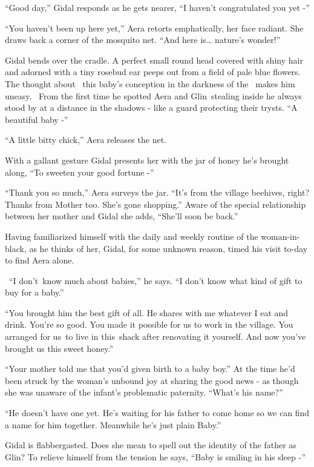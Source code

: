 \documentclass[twoside,11pt]{book}
\begin{document}
``Good day,'' Gidal responds as he gets nearer, ``I haven't congratulated you yet
-''

``You haven't been up here yet,'' Aera retorts emphatically, her face radiant. She draws back
a corner of the mosquito net. ``And here is{\dots} nature's wonder!'' ~

Gidal bends over the cradle. A perfect small round head covered with shiny hair and adorned with a tiny rosebud ear
peeps out from a field of pale blue flowers. The thought about \ this baby's conception in the darkness of the \ makes
him uneasy. ~From the first time he spotted Aera and Glin~stealing inside he always stood by at a distance in the
shadows - like a guard protecting their trysts. ``A beautiful baby -''

``A little bitty chick,'' Aera releases the net.

With a gallant gesture Gidal presents her with the jar of honey he's brought along, ``To sweeten your good
fortune -''

``Thank you so much,'' Aera surveys the jar. ``It's from the village beehives,
right? Thanks from Mother too. She's gone shopping.'' Aware of the special relationship between her mother
and Gidal she adds, ``She'll soon be back.''

Having familiarized himself with the daily and weekly routine of the woman-in-black, as he thinks of her, Gidal, for
some unknown reason, timed his visit to-day to find Aera alone.

\ ``I don't~know much about babies,'' he says. ``I don't know what kind of gift
to buy for a baby.''

``You brought him the best gift of all. He shares with me whatever I eat and drink. You're so good. You
made it possible{ }for us to work in the village. You arranged for us~to live
in this~shack after renovating it yourself. And now you've brought us this sweet honey.''

``Your mother told me that you'd given{ }birth to a baby
boy.'' At the time he'd been struck by the woman's unbound joy at sharing the good news - as though she
was unaware of the infant's{ }problematic paternity. ``What's his name?''

``He doesn't have one yet. He's waiting for his father to come home so we can find a name for him together.
Meanwhile he's just plain Baby.''

Gidal is flabbergasted. Does she mean to spell out the identity of the father as Glin? To relieve himself from the
tension he says, ``Baby is smiling in his sleep -'' ~
\end{document}
